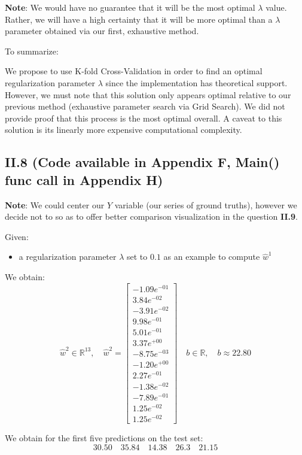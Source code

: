 \documentclass{homework}
\begin{document}
\textbf{Note}: We would have no guarantee that it will be the most optimal $\lambda$ value. Rather, we will have 
a high certainty that it will be more optimal than a $\lambda$ parameter obtained via our first, exhaustive method.

To summarize:

\textcolor{OliveGreen}{We propose to use K-fold Cross-Validation in order to find an optimal regularization parameter 
$\lambda$ since the implementation has theoretical support. However, we must note that this solution only appears optimal
relative to our previous method (exhaustive parameter search via Grid Search). We did not provide proof that this process is
the most optimal overall. A caveat to this solution is its linearly more expensive computational complexity.}

\subsection*{II.8 (Code available in Appendix F, Main() func call in Appendix H)} 

\textbf{Note}: We could center our $Y$ variable (our series of ground truths), however we decide not to so as to offer 
better comparison visualization in the question \textbf{II.9}.

Given:
\begin{itemize}
    \item a regularization parameter $\lambda$ set to $0.1$ as an example to compute $\hat{w}^1$
\end{itemize}
We obtain:
$$\hat{w}^2\in\mathbb{R}^{13},\quad\hat{w}^2 = \begin{bmatrix}
-1.09e^{-01} \\ 3.84e^{-02} \\ -3.91e^{-02} \\ 9.98e^{-01} \\ 5.01e^{-01} \\ 3.37e^{+00} \\
-8.75e^{-03} \\ -1.20e^{+00} \\ 2.27e^{-01} \\ -1.38e^{-02} \\ -7.89e^{-01} \\ 1.25e^{-02} \\
1.25e^{-02} 
\end{bmatrix}\quad b\in\mathbb{R},\quad b\approx22.80$$

We obtain for the first five predictions on the test set:
$$30.50\quad 35.84\quad 14.38\quad 26.3\quad 21.15$$
\end{document}
